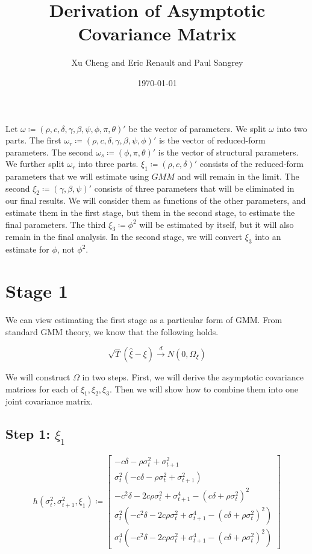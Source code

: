 \documentclass[11pt, letterpaper, twoside, final]{article}
\author{Xu Cheng and Eric Renault and Paul Sangrey}
\title{Derivation of Asymptotic Covariance Matrix}
\date{\today}
\newcommand*{\dto}{\overset{d}{\longrightarrow}}
\begin{document}
\maketitle

Let $\omega \coloneqq (\rho, c, \delta, \gamma, \beta, \psi, \phi, \pi, \theta)'$ be the vector of parameters.
We split $\omega$ into two parts.
The first $\omega_r \coloneqq (\rho, c, \delta, \gamma, \beta, \psi, \phi)'$ is the vector of reduced-form
parameters.
The second $\omega_s \coloneqq (\phi, \pi, \theta)'$ is the vector of structural parameters. 
We further split $\omega_r$ into three parts. 
$\xi_1 \coloneqq (\rho, c, \delta)'$ consists of the reduced-form parameters that we will estimate using $GMM$
and will remain in the limit.
The second $\xi_2 \coloneqq (\gamma, \beta, \psi)'$ consists of three parameters that will be eliminated in our
final results. 
We will consider them as functions of the other parameters, and estimate them in the first stage, but
 them in the second stage, to estimate the final parameters.
The third $\xi_3 \coloneqq \phi^2$ will be estimated by itself, but it will also remain in the final analysis.
In the second stage, we will convert $\xi_3$ into an estimate for $\phi$, not $\phi^2$.

\section{Stage 1}

We can view estimating the first stage as a particular form of GMM.
From standard GMM theory, we know that the following holds.

\begin{equation}
    \sqrt{T} (\hat{\xi} - \xi)  \dto N\left(0, \Omega_{\xi}\right)
\end{equation}


We will construct $\Omega$ in two steps.
First, we will derive the asymptotic covariance matrices for each of $\xi_1, \xi_2, \xi_3$.
Then we will show how to combine them into one joint covariance matrix.

\subsection{Step 1: $\xi_1$}

\begin{equation}
    h(\sigma^2_{t},\sigma^2_{t+1}, \xi_1) \coloneqq 
\begin{bmatrix}
    - c \delta - \rho \sigma^2_{t} + \sigma^2_{t+1}\\
%
    \sigma^2_{t} \left(- c \delta - \rho \sigma^2_{t} + \sigma^2_{t+1}\right)\\
%
    - c^{2} \delta - 2 c \rho \sigma^2_{t} + \sigma^4_{t+1} - \left(c \delta + \rho \sigma^2_{t}\right)^{2}\\
%
    \sigma^2_{t} \left(- c^{2} \delta - 2 c \rho \sigma^2_{t} + \sigma^4_{t+1} - \left(c \delta + \rho
    \sigma^2_{t}\right)^{2}\right)\\
%
    \sigma^4_{t} \left(- c^{2} \delta - 2 c \rho \sigma^2_{t} + \sigma^4_{t+1} - \left(c \delta + \rho
    \sigma^2_{t}\right)^{2}\right)
\end{bmatrix}
\end{equation}
\end{document}
